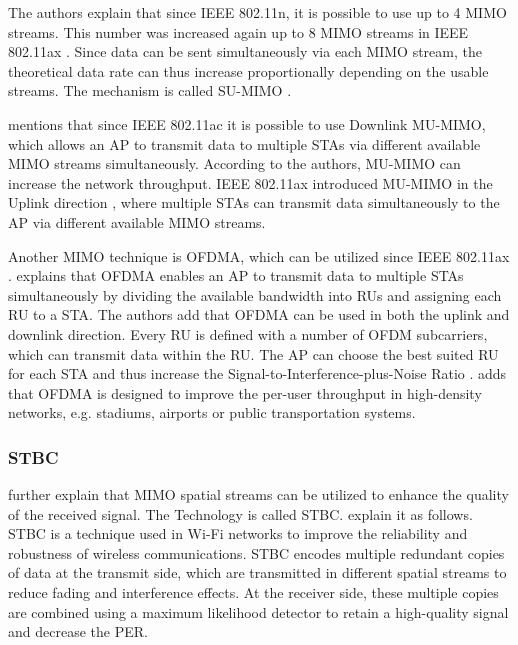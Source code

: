 The authors explain that since IEEE 802.11n, it is possible to use up to \num{4} MIMO streams.
This number was increased again up to \num{8} MIMO streams in IEEE 802.11ax \cite{ieee_standard_2021ax}.
Since data can be sent simultaneously via each MIMO stream,
the theoretical data rate can thus increase proportionally depending on the usable streams.
The mechanism is called \ac{SU}-\ac{MIMO} \cite{ieee_standard_2021ax}.

\textcite[308]{sauter_wireless_2022} mentions that since IEEE 802.11ac it is possible to use Downlink \ac{MU}-\ac{MIMO},
which allows an \ac{AP} to transmit data to multiple \acp{STA} via different available \ac{MIMO} streams simultaneously.
According to the authors, \ac{MU}-\ac{MIMO} can increase the network throughput.
IEEE 802.11ax introduced \ac{MU}-\ac{MIMO} in the Uplink direction \cite{ieee_standard_2021ax}, where multiple \acp{STA} can transmit data simultaneously to the \ac{AP} via different available \ac{MIMO} streams.


Another \ac{MIMO} technique is \ac{OFDMA}, which can be utilized since IEEE 802.11ax \cite{ieee_standard_2021ax, avallone_will_2021, omar_survey_2016}.
\textcite{avallone_will_2021} explains that \ac{OFDMA} enables an \ac{AP} to transmit data to multiple \acp{STA} simultaneously by dividing the available bandwidth into \acp{RU} and assigning each \ac{RU} to a \ac{STA}.
The authors add that \ac{OFDMA} can be used in both the uplink and downlink direction. Every \ac{RU} is defined with a number of \ac{OFDM} subcarriers, which can transmit data within the \ac{RU}.
The \ac{AP} can choose the best suited \ac{RU} for each \ac{STA} and thus increase the Signal-to-Interference-plus-Noise Ratio \cite{khorov_tutorial_2019}.
\textcite{behara_performance_2022} adds that \ac{OFDMA} is designed to improve the per-user throughput in high-density networks, e.g.
stadiums, airports or public transportation systems.

\subsubsection*{\acf{STBC}}
\textcite{abbas_efficient_2016} further explain that \ac{MIMO} spatial streams can be utilized to enhance the
quality of the received signal.
The Technology is called \ac{STBC}.
\textcite{santumon_space-time_2012} explain it as follows.
\ac{STBC} is a technique used in Wi-Fi networks to improve the reliability and robustness of wireless communications.
\ac{STBC} encodes multiple redundant copies of data at the transmit side, which are transmitted in different spatial streams to
reduce fading and interference effects.
At the receiver side, these multiple copies are combined using a maximum likelihood detector
to retain a high-quality signal and decrease the \ac{PER}.


